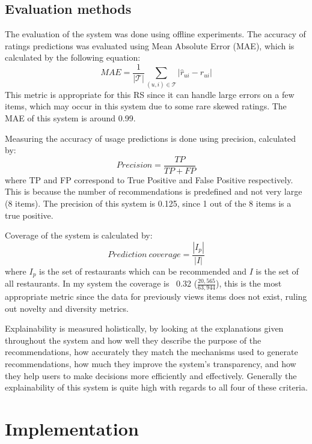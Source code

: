 \documentclass[conference]{IEEEtran}
\begin{document}
\subsection{Evaluation methods}
The evaluation of the system was done using offline experiments. 
The accuracy of ratings predictions was evaluated using Mean Absolute Error (MAE), which is calculated by the 
following equation:
\begin{equation}
    MAE = \frac{1}{|\mathcal{T}|} \sum_{(u,i)\in{\mathcal{T}}} {|\widehat{r}_{ui} - r_{ui}|}
\end{equation}
This metric is appropriate for this RS since it can handle large errors on a few items, which may occur in this system 
due to some rare skewed ratings. 
The MAE of this system is around 0.99. 

Measuring the accuracy of usage predictions is done using precision, calculated by: 
\begin{equation}
    Precision = \frac{TP}{TP+FP}
\end{equation}
where TP and FP correspond to True Positive and False Positive respectively. 
This is because the number of recommendations is predefined and not very large (8 items). 
The precision of this system is 0.125, since 1 out of the 8 items is a true positive. 

Coverage of the system is calculated by:
\begin{equation}
    Prediction\ coverage = \frac{|I_p|}{|I|}
\end{equation} 
where $I_p$ is the set of restaurants which can be recommended and $I$ is the set of all restaurants. 
In my system the coverage is ~0.32 ($\frac{20,565}{63,944}$), this is the most appropriate metric since 
the data for previously views items does not exist, ruling out novelty and diversity metrics. 

Explainability is measured holistically, by looking at the explanations given throughout the system and how 
well they describe the purpose of the recommendations, how accurately they match the mechanisms used to 
generate recommendations, how much they improve the system's transparency, and how they help users to make decisions 
more efficiently and effectively. 
Generally the explainability of this system is quite high with regards to all four of these criteria. 

\section{Implementation}
\end{document}
